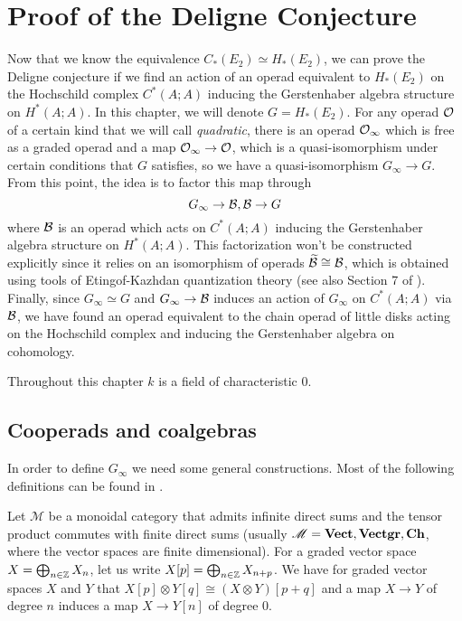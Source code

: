 \documentclass[TFM.tex]{subfiles}
\begin{document}
\chapter{Proof of the Deligne Conjecture}


Now that we know the equivalence $C_*(E_2)\simeq H_*(E_2)$, we can prove the Deligne conjecture if we find an action of an operad equivalent to $H_*(E_2)$ on the Hochschild complex $C^*(A;A)$ inducing the Gerstenhaber algebra structure on $H^*(A;A)$. In this chapter, we will denote $G=H_*(E_2)$. For any operad ${\mathcal O}$ of a certain kind that we will call \emph{quadratic}, there is an operad ${\mathcal O}_\infty$ which is free as a graded operad and a map ${\mathcal O}_\infty\to{\mathcal O}$, which is a quasi-isomorphism under certain conditions that $G$ satisfies, so we have a quasi-isomorphism $G_\infty\to G$. From this point, the idea is to factor this map through
\[
G_\infty\to \mathcal{B},\mathcal{B}\to G
\]
where $\mathcal{B}$ is an operad which acts on $C^*(A;A)$ inducing the Gerstenhaber algebra structure on $H^*(A;A)$.  This factorization won't be constructed explicitly since it relies on an isomorphism of operads $\widetilde{\mathcal{B}}\cong\mathcal{B}$, which is obtained using tools of Etingof-Kazhdan quantization theory \cite{EK} (see also Section 7 of \cite{Hinich}). Finally, since $G_\infty\simeq G$ and $G_\infty\to\mathcal{B}$ induces an action of $G_\infty$ on $C^*(A;A)$ via $\mathcal{B}$, we have found an operad equivalent to the chain operad of little disks acting on the Hochschild complex and inducing the Gerstenhaber algebra on cohomology. 

Throughout this chapter $k$ is a field of characteristic 0. 


\section{Cooperads and coalgebras}


In order to define $G_\infty$ we need some general constructions. Most of the following definitions can be found in \cite{Hinich}. 

Let $\mathscr{M}$ be a monoidal category that admits infinite direct sums and the tensor product commutes with finite direct sums (usually $\mathscr{M}=\mathrm{\mathbf{Vect}}, \mathrm{\mathbf{Vectgr}},\mathrm{\mathbf{Ch}}$, where the vector spaces are finite dimensional). For a graded vector space $X=\bigoplus_{n\in\mathbb{Z}}X_n$, let us write $X[p]=\bigoplus_{n\in\mathbb{Z}}X_{n+p}$. We have for graded vector spaces $X$ and $Y$ that $X[p]\otimes Y[q]\cong (X\otimes Y)[p+q]$ and a map $X\to Y$ of degree $n$ induces a map $X\to Y[n]$ of degree 0. 
\end{document}
